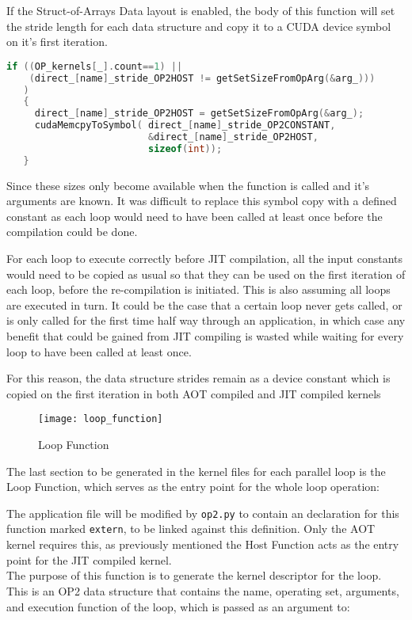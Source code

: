 If the Struct-of-Arrays Data layout is enabled, the body of this function will set the stride length for each data structure and copy it to a CUDA device symbol on it's first iteration.
\begin{lstlisting}[linewidth = \textwidth, framesep=0pt,escapechar=:, language=C,backgroundcolor=\color{red!20}]
if ((OP_kernels[_].count==1) ||
    (direct_[name]_stride_OP2HOST != getSetSizeFromOpArg(&arg_)))
   )
   {
     direct_[name]_stride_OP2HOST = getSetSizeFromOpArg(&arg_);
     cudaMemcpyToSymbol( direct_[name]_stride_OP2CONSTANT,
                         &direct_[name]_stride_OP2HOST,
                         sizeof(int));
   }
\end{lstlisting}


Since these sizes only become available when the function is called and it's arguments are known. It was difficult to replace this symbol copy with a defined constant as each loop would need to have been called at least once before the compilation could be done.
\par
For each loop to execute correctly before JIT compilation, all the input constants would need to be copied as usual so that they can be used on the first iteration of each loop, before the re-compilation is initiated. This is also assuming all loops are executed in turn. It could be the case that a certain loop never gets called, or is only called for the first time half way through an application, in which case any benefit that could be gained from JIT compiling is wasted while waiting for every loop to have been called at least once.
\par
For this reason, the data structure strides remain as a device constant which is copied on the first iteration in both AOT compiled and JIT compiled kernels

\begin{wrapfigure}{r}{.33\textwidth}
  \centering
  \caption{Loop Function}
  \label{fig:loop_func}
  \texttt{[image: loop\_function]}
\end{wrapfigure}
The last section to be generated in the kernel files for each parallel loop is the Loop Function, which serves as the entry point for the whole loop operation:

\noindent The application file will be modified by \verb|op2.py| to contain an declaration for this function marked \verb|extern|, to be linked against this definition. Only the AOT kernel requires this, as previously mentioned the Host Function acts as the entry point for the JIT compiled kernel.
\\
The purpose of this function is to generate the kernel descriptor for the loop. This is an OP2 data structure that contains the name, operating set, arguments, and execution function of the loop, which is passed as an argument to:

